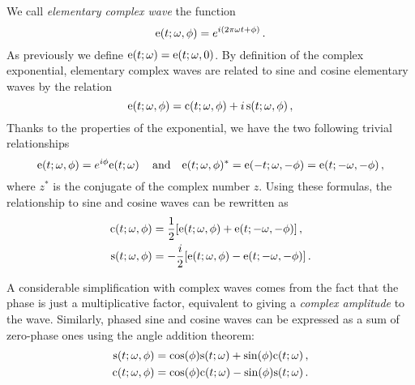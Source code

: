 \begin{definition}
  We call \emph{elementary complex wave} the function
  \begin{equation}
    \mathrm{e}(t;\omega,\phi)=e^{i(2\pi\omega t + \phi)}\,.
  \end{equation}
  As previously we define $\mathrm{e}(t;\omega)=\mathrm{e}(t;\omega,0)$. By definition of the complex
  exponential, elementary complex waves are related to sine and cosine elementary waves by
  the relation
  \begin{equation}
    \mathrm{e}(t;\omega,\phi)=\mathrm{c}(t;\omega,\phi)+i\,\mathrm{s}(t;\omega,\phi)\,,
  \end{equation}
  Thanks to the properties of the exponential, we have the two following trivial
  relationships
  \begin{equation}
    \mathrm{e}(t;\omega,\phi)=e^{i\phi}\mathrm{e}(t;\omega)\,\quad\text{and}\quad
    \mathrm{e}(t;\omega,\phi)^*=\mathrm{e}(-t;\omega,-\phi)=\mathrm{e}(t;-\omega,-\phi)\,,\label{eq:cw-conj}
  \end{equation}
  where $z^*$ is the conjugate of the complex number $z$. Using these formulas, the
  relationship to sine and cosine waves can be rewritten as
  \begin{align}
    \mathrm{c}(t;\omega,\phi)&=\frac{1}{2}[\mathrm{e}(t;\omega,\phi)+\mathrm{e}(t;-\omega,-\phi)]\,,
    \label{eq:cwtoew}\\
    \mathrm{s}(t;\omega,\phi)&=-\frac{i}{2}[\mathrm{e}(t;\omega,\phi)-\mathrm{e}(t;-\omega,-\phi)]\,.
    \label{eq:swtoew}
  \end{align}
\end{definition}

A considerable simplification with complex waves comes from the fact that the phase is
just a multiplicative factor, equivalent to giving a \emph{complex amplitude} to the wave.
Similarly, phased sine and cosine waves can be expressed as a sum of zero-phase ones using
the angle addition theorem:
\begin{align}
  \mathrm{s}(t;\omega,\phi)&=\cos(\phi)\mathrm{s}(t;\omega)+\sin(\phi)\mathrm{c}(t;\omega)\,,\\
  \mathrm{c}(t;\omega,\phi)&=\cos(\phi)\mathrm{c}(t;\omega)-\sin(\phi)\mathrm{s}(t;\omega)\,.
\end{align}
